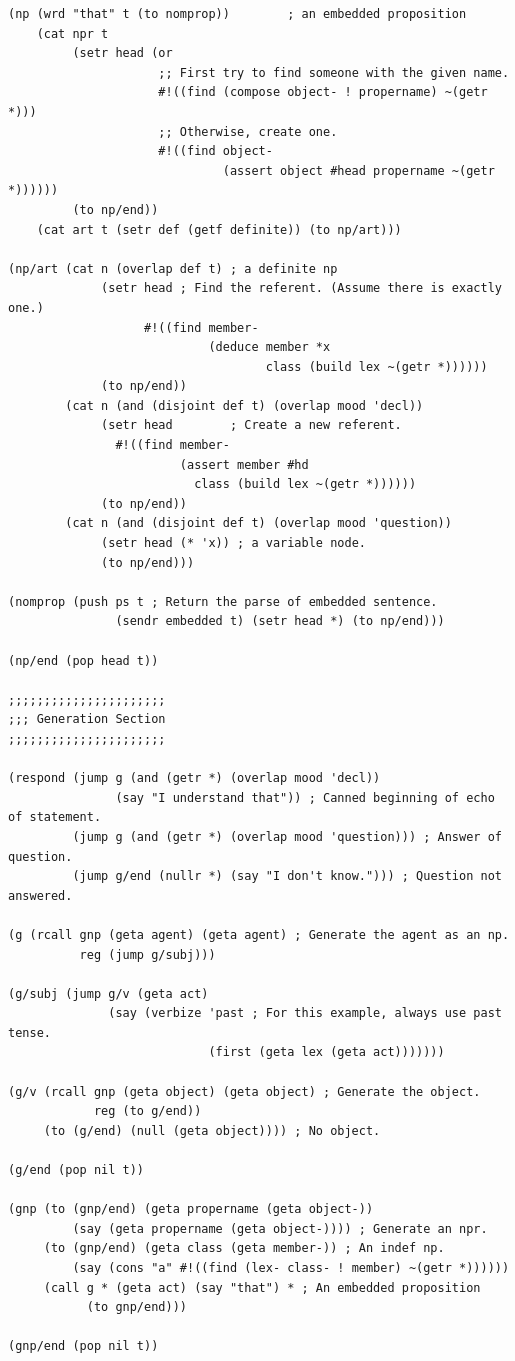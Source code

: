 \documentclass{book}
\begin{document}
\pagebreak
\begin{verbatim}
(np (wrd "that" t (to nomprop))        ; an embedded proposition
    (cat npr t
         (setr head (or
                     ;; First try to find someone with the given name.
                     #!((find (compose object- ! propername) ~(getr *)))
                     ;; Otherwise, create one.
                     #!((find object-
                              (assert object #head propername ~(getr *))))))
         (to np/end))
    (cat art t (setr def (getf definite)) (to np/art)))

(np/art (cat n (overlap def t) ; a definite np
             (setr head ; Find the referent. (Assume there is exactly one.)
                   #!((find member-
                            (deduce member *x
                                    class (build lex ~(getr *))))))
             (to np/end))
        (cat n (and (disjoint def t) (overlap mood 'decl))
             (setr head        ; Create a new referent.
               #!((find member-
                        (assert member #hd
                          class (build lex ~(getr *))))))
             (to np/end))
        (cat n (and (disjoint def t) (overlap mood 'question))
             (setr head (* 'x)) ; a variable node.
             (to np/end)))

(nomprop (push ps t ; Return the parse of embedded sentence.
               (sendr embedded t) (setr head *) (to np/end)))

(np/end (pop head t))

;;;;;;;;;;;;;;;;;;;;;;
;;; Generation Section
;;;;;;;;;;;;;;;;;;;;;;

(respond (jump g (and (getr *) (overlap mood 'decl))
               (say "I understand that")) ; Canned beginning of echo of statement.
         (jump g (and (getr *) (overlap mood 'question))) ; Answer of question.
         (jump g/end (nullr *) (say "I don't know."))) ; Question not answered.

(g (rcall gnp (geta agent) (geta agent) ; Generate the agent as an np.
          reg (jump g/subj)))

(g/subj (jump g/v (geta act)
              (say (verbize 'past ; For this example, always use past tense.
                            (first (geta lex (geta act)))))))

(g/v (rcall gnp (geta object) (geta object) ; Generate the object.
            reg (to g/end))
     (to (g/end) (null (geta object)))) ; No object.

(g/end (pop nil t))

(gnp (to (gnp/end) (geta propername (geta object-))
         (say (geta propername (geta object-)))) ; Generate an npr.
     (to (gnp/end) (geta class (geta member-)) ; An indef np.
         (say (cons "a" #!((find (lex- class- ! member) ~(getr *))))))
     (call g * (geta act) (say "that") * ; An embedded proposition
           (to gnp/end)))

(gnp/end (pop nil t))
\end{verbatim}
\end{document}
